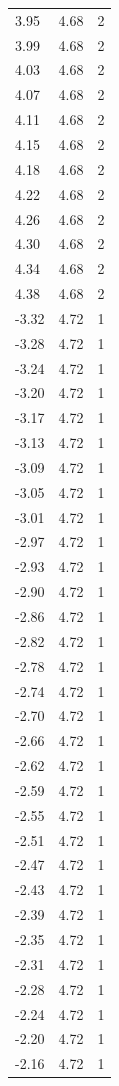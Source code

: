 \begin{longtable}{lrr}
  3.95 & 4.68 & 2 \\
  3.99 & 4.68 & 2 \\
  4.03 & 4.68 & 2 \\
  4.07 & 4.68 & 2 \\
  4.11 & 4.68 & 2 \\
  4.15 & 4.68 & 2 \\
  4.18 & 4.68 & 2 \\
  4.22 & 4.68 & 2 \\
  4.26 & 4.68 & 2 \\
  4.30 & 4.68 & 2 \\
  4.34 & 4.68 & 2 \\
  4.38 & 4.68 & 2 \\
  -3.32 & 4.72 & 1 \\
  -3.28 & 4.72 & 1 \\
  -3.24 & 4.72 & 1 \\
  -3.20 & 4.72 & 1 \\
  -3.17 & 4.72 & 1 \\
  -3.13 & 4.72 & 1 \\
  -3.09 & 4.72 & 1 \\
  -3.05 & 4.72 & 1 \\
  -3.01 & 4.72 & 1 \\
  -2.97 & 4.72 & 1 \\
  -2.93 & 4.72 & 1 \\
  -2.90 & 4.72 & 1 \\
  -2.86 & 4.72 & 1 \\
  -2.82 & 4.72 & 1 \\
  -2.78 & 4.72 & 1 \\
  -2.74 & 4.72 & 1 \\
  -2.70 & 4.72 & 1 \\
  -2.66 & 4.72 & 1 \\
  -2.62 & 4.72 & 1 \\
  -2.59 & 4.72 & 1 \\
  -2.55 & 4.72 & 1 \\
  -2.51 & 4.72 & 1 \\
  -2.47 & 4.72 & 1 \\
  -2.43 & 4.72 & 1 \\
  -2.39 & 4.72 & 1 \\
  -2.35 & 4.72 & 1 \\
  -2.31 & 4.72 & 1 \\
  -2.28 & 4.72 & 1 \\
  -2.24 & 4.72 & 1 \\
  -2.20 & 4.72 & 1 \\
  -2.16 & 4.72 & 1 \\

\end{longtable}

